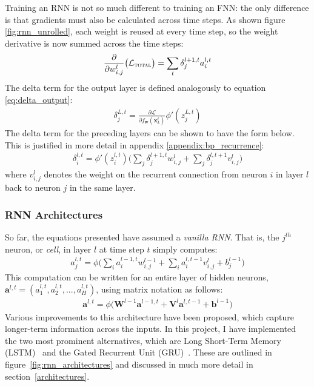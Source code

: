 \documentclass[a4paper, 12pt]{report}
\newcommand{\tit}[1]{\textit{#1}}
\begin{document}
Training an RNN is not so much different to training an FNN: the only difference is that gradients must also be calculated across time steps. As shown figure \ref{fig:rnn_unrolled}, each weight is reused at every time step, so the weight derivative is now summed across the time steps:
\begin{gather}
	\frac{\partial}{\partial w_{i,j}^l} \big( \mathcal{L}_{\text{\scshape total}} \big) = \sum_t \delta_j^{l+1,t} a_i^{l,t}
\end{gather}
The delta term for the output layer is defined analogously to equation \ref{eq:delta_output}:
\begin{gather} \label{eq:delta_output_rnn}
	\delta_j^{L,t} = \frac{\partial \mathcal{L}}{\partial f_{\mathbf{w}}(\mathbf{x}_k^t)} \phi'(z_j^{L,t})
\end{gather}
The delta term for the preceding layers can be shown to have the form below. This is justified in more detail in appendix \ref{appendix:bp_recurrence}:
\begin{gather} \label{eq:delta_hidden_rnn}
	\delta_i^{l,t} = \phi'(z_i^{l,t}) \big( \sum_j \delta_j^{l+1,t} w_{i,j}^l + \sum_j \delta_j^{l,t+1} v_{i,j}^l \big)
\end{gather}
where $v_{i,j}^l$ denotes the weight on the recurrent connection from neuron $i$ in layer $l$ back to neuron $j$ in the same layer.

\subsubsection{RNN Architectures}
So far, the equations presented have assumed a \tit{vanilla RNN}. That is, the $j^{th}$ neuron, or \tit{cell}, in layer $l$ at time step $t$ simply computes:
\begin{gather}
	a_j^{l, t} = \phi \big( \sum_i a_i^{l - 1, t} w_{i,j}^{l-1} + \sum_i a_i^{l, t - 1} v_{i,j}^l + b^{l - 1}_j \big)
\end{gather}
This computation can be written for an entire layer of hidden neurons, $\mathbf{a}^{l, t} = (a_1^{l, t}, a_2^{l, t}, ..., a_H^{l, t})$, using matrix notation as follows:
\begin{gather} \label{eq:vanilla_rnn}
	\mathbf{a}^{l, t} = \phi \big( \mathbf{W}^{l - 1} \mathbf{a}^{l - 1, t} + \mathbf{V}^l \mathbf{a}^{l, t - 1} + \mathbf{b}^{l - 1} \big)
\end{gather}
Various improvements to this architecture have been proposed, which capture longer-term information across the inputs. In this project, I have implemented the two most prominent alternatives, which are Long Short-Term Memory (LSTM)~\cite{lstm:hochreiter1997} and the Gated Recurrent Unit (GRU)~\cite{gru:cho2014}. These are outlined in figure~\ref{fig:rnn_architectures} and discussed in much more detail in section~\ref{architectures}. \\
\end{document}
